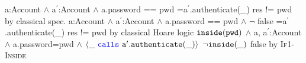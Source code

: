 {
	\begin{proofexample}
			{\proofstepwithrule
				{\hoareEx
						{a:Account $\wedge$ a$^\prime$:Account $\wedge$ a.password == pwd}
						{=a$^\prime$.authenticate(\_)}
						{res != pwd}
						}
					{by classical spec.}
			}
			{\proofstepwithrule
				{\hoareEx
						{a:Account $\wedge$ a$^\prime$:Account $\wedge$ a.password == pwd $\wedge$ $\neg$ false}
						{=a$^\prime$.authenticate(\_)}
						{res != pwd}
						}
					{by classical Hoare logic}
			}
			{\proofstepwithrule
				{\onlyIfSingleExAlt
						{$\texttt{inside}( {\texttt{pwd}} )$ $\wedge$ a, a$^\prime$:Account $\wedge$ a.password=pwd $\wedge$ $\langle \_\ {\color{blue}\texttt{calls}}\ {\texttt{a}}^\prime.{\texttt{authenticate}}(\_) \rangle$}
						{$\neg \texttt{inside}( \_ )$}
						{false}
						}
					{by \textsc{If1-Inside}}
			}
		\endproofsteps
	\end{proofexample}
	}
